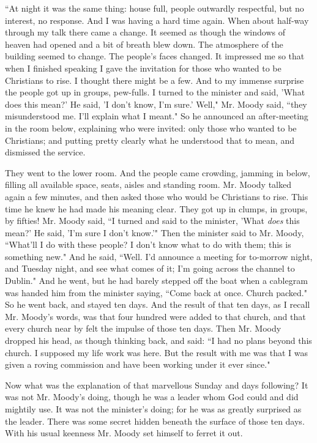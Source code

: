 ``At night it was the same thing: house full, people outwardly respectful,
but no interest, no response. And I was having a hard time again. When
about half-way through my talk there came a change. It seemed as though
the windows of heaven had opened and a bit of breath blew down. The
atmosphere of the building seemed to change. The people's faces changed.
It impressed me so that when I finished speaking I gave the invitation for
those who wanted to be Christians to rise. I thought there might be a few.
And to my immense surprise the people got up in groups, pew-fulls. I
turned to the minister and said, 'What does this mean?' He said, 'I don't
know, I'm sure.' Well," Mr. Moody said, ``they misunderstood me. I'll
explain what I meant." So he announced an after-meeting in the room below,
explaining who were invited: only those who wanted to be Christians; and
putting pretty clearly what he understood that to mean, and dismissed the
service.

They went to the lower room. And the people came crowding, jamming in
below, filling all available space, seats, aisles and standing room. Mr.
Moody talked again a few minutes, and then asked those who would be
Christians to rise. This time he knew he had made his meaning clear. They
got up in clumps, in groups, by fifties! Mr. Moody said, ``I turned and
said to the minister, 'What \textit{does} this mean?' He said, 'I'm sure I don't
know.'" Then the minister said to Mr. Moody, ``What'll I do with these
people? I don't know what to do with them; this is something new." And he
said, ``Well. I'd announce a meeting for to-morrow night, and Tuesday
night, and see what comes of it; I'm going across the channel to Dublin."
And he went, but he had barely stepped off the boat when a cablegram was
handed him from the minister saying, ``Come back at once. Church packed."
So he went back, and stayed ten days. And the result of that ten days, as
I recall Mr. Moody's words, was that four hundred were added to that
church, and that every church near by felt the impulse of those ten days.
Then Mr. Moody dropped his head, as though thinking back, and said: ``I had
no plans beyond this church. I supposed my life work was here. But the
result with me was that I was given a roving commission and have been
working under it ever since."

Now what was the explanation of that marvellous Sunday and days following?
It was not Mr. Moody's doing, though he was a leader whom God could and
did mightily use. It was not the minister's doing; for he was as greatly
surprised as the leader. There was some secret hidden beneath the surface
of those ten days. With his usual keenness Mr. Moody set himself to ferret
it out.


